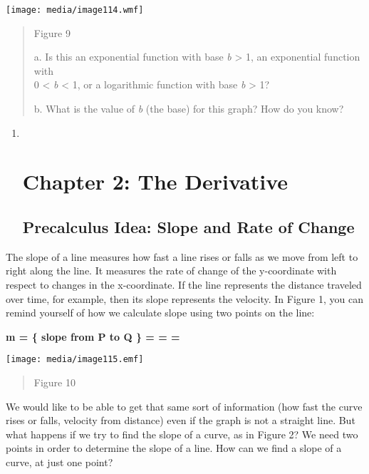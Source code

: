 \texttt{[image: media/image114.wmf]}

\begin{quote}
Figure 9

a. Is this an exponential function with base \emph{b} \textgreater{} 1,
an exponential function with\\
0 \textless{} \emph{b} \textless{} 1, or a logarithmic function with
base \emph{b} \textgreater{} 1?

b. What is the value of \emph{b} (the base) for this graph? How do you
know?
\end{quote}

\begin{enumerate}
\item ~
  \hypertarget{chapter-2-the-derivative}{\section{Chapter 2: The
  Derivative}\label{chapter-2-the-derivative}}

  \hypertarget{precalculus-idea-slope-and-rate-of-change}{\subsection{Precalculus
  Idea: Slope and Rate of
  Change}\label{precalculus-idea-slope-and-rate-of-change}}
\end{enumerate}

The slope of a line measures how fast a line rises or falls as we move
from left to right along the line. It measures the rate of change of the
y-coordinate with respect to changes in the x-coordinate. If the line
represents the distance traveled over time, for example, then its slope
represents the velocity. In Figure 1, you can remind yourself of how we
calculate slope using two points on the line:

\textbf{m = \{ slope from P to Q \} = = = }

\texttt{[image: media/image115.emf]}

\begin{quote}
Figure 10
\end{quote}

We would like to be able to get that same sort of information (how fast
the curve rises or falls, velocity from distance) even if the graph is
not a straight line. But what happens if we try to find the slope of a
curve, as in Figure 2? We need two points in order to determine the
slope of a line. How can we find a slope of a curve, at just one point?

